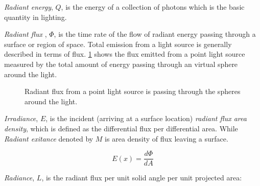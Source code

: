 \emph{Radiant energy}, \(Q\), is the energy of a collection of photons which is the basic quantity in lighting. 

\emph{Radiant flux} , \(\Phi\), is the time rate of the flow of radiant energy passing through a surface or region of space. Total emission from a light source is generally described in terms of flux. \ref{fig:flux_point_light} shows the flux emitted from a point light source measured by the total amount of energy passing through an virtual sphere around the light. 

\begin{figure}[htp] 
    \centering 
    \renewcommand{\thefigure}{\thechapter.\arabic{figure}}
    \caption[]{Radiant flux from a point light source is passing through the spheres around the light.}
    \label{fig:flux_point_light} 
\end{figure} 

\emph{Irradiance}, \(E\), is the incident (arriving at a surface location) \emph{radiant flux area density}, which is defined as the differential flux per differential area. While \emph{Radiant exitance} denoted by \(M\) is area density of flux leaving a surface.  

\begin{equation}
E(x) = \frac{d\Phi}{dA}
\end{equation}

\emph{Radiance}, \(L\), is the radiant flux per unit solid angle per unit projected area: 

